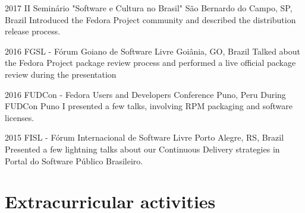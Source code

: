 \documentclass[print]{friggeri-cv}
\begin{document}
\begin{entrylist}


\entry
{2017}
{II Seminário "Software e Cultura no Brasil"}
{São Bernardo do Campo, SP, Brazil}
{Introduced the Fedora Project community and described the distribution release process.}


\entry
{2016}
{FGSL - Fórum Goiano de Software Livre}
{Goiânia, GO, Brazil}
{Talked about the Fedora Project package review process and performed a live official package review during the presentation}

\entry
{2016}
{FUDCon - Fedora Users and Developers Conference}
{Puno, Peru}
{During FUDCon Puno I presented a few talks, involving RPM packaging and software licenses.}


\entry
{2015}
{FISL - Fórum Internacional de Software Livre}
{Porto Alegre, RS, Brazil}
{Presented a few lightning talks about our Continuous Delivery strategies in
  Portal do Software Público Brasileiro.}


\end{entrylist}


\section{Extracurricular activities}
\end{document}
